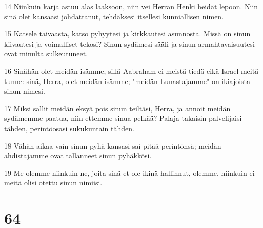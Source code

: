 \par 14 Niinkuin karja astuu alas laaksoon, niin vei Herran Henki heidät lepoon. Niin sinä olet kansaasi johdattanut, tehdäksesi itsellesi kunniallisen nimen.
\par 15 Katsele taivaasta, katso pyhyytesi ja kirkkautesi asunnosta. Missä on sinun kiivautesi ja voimalliset tekosi? Sinun sydämesi sääli ja sinun armahtavaisuutesi ovat minulta sulkeutuneet.
\par 16 Sinähän olet meidän isämme, sillä Aabraham ei meistä tiedä eikä Israel meitä tunne: sinä, Herra, olet meidän isämme; "meidän Lunastajamme" on ikiajoista sinun nimesi.
\par 17 Miksi sallit meidän eksyä pois sinun teiltäsi, Herra, ja annoit meidän sydämemme paatua, niin ettemme sinua pelkää? Palaja takaisin palvelijaisi tähden, perintöosasi sukukuntain tähden.
\par 18 Vähän aikaa vain sinun pyhä kansasi sai pitää perintönsä; meidän ahdistajamme ovat tallanneet sinun pyhäkkösi.
\par 19 Me olemme niinkuin ne, joita sinä et ole ikinä hallinnut, olemme, niinkuin ei meitä olisi otettu sinun nimiisi.

\chapter{64}

